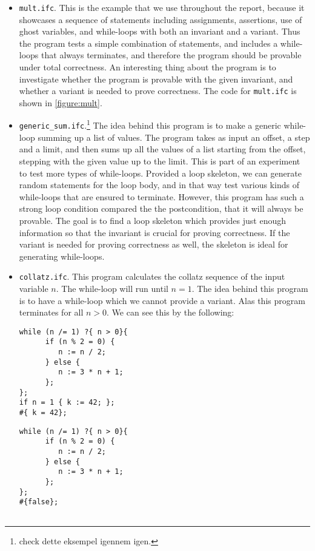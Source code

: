\begin{itemize}
  \item {\texttt{mult.ifc}.} 
  This is the example that we use throughout the report, because it showcases a sequence of statements including assignments, assertions, use of ghost variables, and while-loops with both an invariant and a variant.
  Thus the program tests a simple combination of statements, and includes a while-loops that always terminates, and therefore the program should be provable under total correctness.
  An interesting thing about the program is to investigate whether the program is provable with the given invariant, and whether a variant is needed to prove correctness.
  The code for \texttt{mult.ifc} is shown in \cref{figure:mult}.
  
  \item{\texttt{generic\_sum.ifc}.}\footnote{check dette eksempel igennem igen.}
  The idea behind this program is to make a generic while-loop summing up a list of values. 
  The program takes as input an offset, a step and a limit, and then sums up all the values of a list starting from the offset, stepping with the given value up to the limit.
  This is part of an experiment to test more types of while-loops. Provided a loop skeleton, we can generate random statements for the loop body, and in that way test various kinds of while-loops that are ensured to terminate.
  However, this program has such a strong loop condition compared the the postcondition, that it will always be provable.
  The goal is to find a loop skeleton which provides just enough information so that the invariant is crucial for proving correctness. If the variant is needed for proving correctness as well, the skeleton is ideal for generating while-loops.
  
  \item{\texttt{collatz.ifc}.}
  This program calculates the collatz sequence of the input variable $n$. The while-loop will run until $n = 1$.
        The idea behind this program is to have a while-loop which we cannot provide a variant. Alas this program terminates for all $n > 0$. We can see this by the following:

\begin{minipage}[t]{0.4\textwidth}
  \begin{lstlisting}
while (n /= 1) ?{ n > 0}{
      if (n % 2 = 0) {
         n := n / 2;
      } else {
         n := 3 * n + 1;
      };
};
if n = 1 { k := 42; };
#{ k = 42};
\end{lstlisting}
\end{minipage}
\begin{minipage}[t]{0.4\textwidth}
  \begin{lstlisting}
while (n /= 1) ?{ n > 0}{
      if (n % 2 = 0) {
         n := n / 2;
      } else {
         n := 3 * n + 1;
      };
};
#{false};


\end{lstlisting}
\end{minipage}
\end{itemize}
